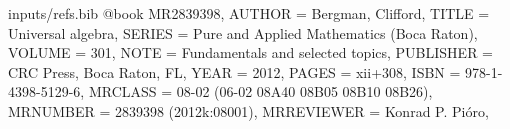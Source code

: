 \begin{filecontents*}{inputs/refs.bib}
@book {MR2839398,
    AUTHOR = {Bergman, Clifford},
     TITLE = {Universal algebra},
    SERIES = {Pure and Applied Mathematics (Boca Raton)},
    VOLUME = {301},
      NOTE = {Fundamentals and selected topics},
 PUBLISHER = {CRC Press, Boca Raton, FL},
      YEAR = {2012},
     PAGES = {xii+308},
      ISBN = {978-1-4398-5129-6},
   MRCLASS = {08-02 (06-02 08A40 08B05 08B10 08B26)},
  MRNUMBER = {2839398 (2012k:08001)},
MRREVIEWER = {Konrad P. Pi{\'o}ro},
}
\end{filecontents*}
\documentclass[12pt,reqno]{amsart}


\usepackage{amsmath,amssymb,amsfonts,amscd}


\usepackage{xspace}
\usepackage[mathcal]{euscript}



\def\OPTpagesize{8.5in,11in}     %
\def\OPTtopmargin{1in}     %
\def\OPTbottommargin{1in}  %
\def\OPTinnermargin{1.5in}    %
\def\OPTbindingoffset{0in} %
\def\OPToutermargin{1.5in}   %
\usepackage[papersize={\OPTpagesize},
             twoside,
             includehead,
             top=\OPTtopmargin,
             bottom=\OPTbottommargin,
             inner=\OPTinnermargin,
             outer=\OPToutermargin,
             bindingoffset=\OPTbindingoffset]{geometry}

\newcommand{\alg}[1]{\ensuremath{\mathbf{#1}}}
\newcommand{\class}[1]{\ensuremath{\mathcal{#1}}}
\newcommand{\var}[1]{\ensuremath{\mathcal{#1}}}
\newcommand{\clop}[1]{\ensuremath{\mathbf{#1}}}
\newcommand{\close}[1]{\ensuremath{\overline{#1}}}
\newcommand{\Id}[1]{\ensuremath{\operatorname{Id}(#1)}}
\newcommand{\Mod}[1]{\ensuremath{\operatorname{Mod}(#1)}}
\newcommand{\defin}[1]{\textbf{#1}}
\newcommand{\Hom}[1]{\ensuremath{\operatorname{Hom}(#1)}}
\newcommand{\Epi}[1]{\ensuremath{\operatorname{Epi}(#1)}}
\newcommand{\Con}[1]{\ensuremath{\operatorname{Con}(#1)}}
\newcommand{\Clo}{\ensuremath{\operatorname{Clo}}}
\newcommand{\Proj}{\ensuremath{\operatorname{Proj}}}
\newcommand{\Sg}[2]{\ensuremath{\operatorname{Sg}^{#1}(#2)}}
\newcommand{\compose}{\ensuremath{\circ}}
\newcommand{\va}{\ensuremath{\mathbf{a}}}
\newcommand{\vb}{\ensuremath{\mathbf{b}}}
\newcommand{\swap}[1]{\ensuremath{\mathtt{swap}(#1)}}
\newcommand{\curry}[1]{\ensuremath{\mathtt{curry}(#1)}}
\newcommand{\uncurry}[1]{\ensuremath{\mathtt{uncurry}(#1)}}

